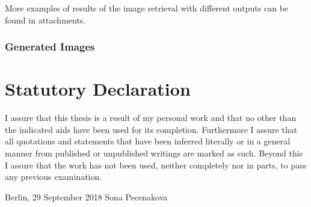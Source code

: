\documentclass[12pt]{report}
\begin{document}
More examples of results of the image retrieval with different outputs can be found in attachments.

\subsection{Generated Images}

\appendix
\newpage
\listoffigures

\newpage
\listoftables

\newpage

\renewcommand{\refname}{Bibliography}

\clearpage


\pagestyle{plain}
\chapter*{Statutory Declaration}
I assure that this thesis is a result of my personal work and that no other than the indicated aids have been used for its completion. Furthermore I assure that all quotations and statements that have been inferred literally or in a general manner from published or unpublished writings are marked as such. Beyond this I assure that the work has not been used, neither completely nor in parts, to pass any previous examination.

\vspace{2cm}
\noindent
Berlin, 29 September 2018
\hfill
Sona Pecenakova
\clearpage
\end{document}
